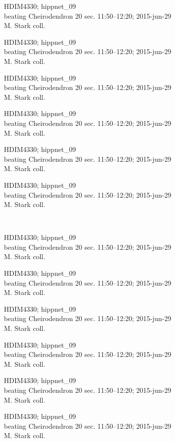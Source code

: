 \documentclass[2pt]{extarticle}
\begin{document}
\noindent
\parbox{0.16\textwidth}{\tiny \raggedright \rule[-0.3\baselineskip]{0pt}{10pt}HDIM4330; hippnet\_09\\ beating Cheirodendron 20 sec. 11:50--12:20; 2015-jun-29\\ M. Stark coll.}
\parbox{0.16\textwidth}{\tiny \raggedright \rule[-0.3\baselineskip]{0pt}{10pt}HDIM4330; hippnet\_09\\ beating Cheirodendron 20 sec. 11:50--12:20; 2015-jun-29\\ M. Stark coll.}
\parbox{0.16\textwidth}{\tiny \raggedright \rule[-0.3\baselineskip]{0pt}{10pt}HDIM4330; hippnet\_09\\ beating Cheirodendron 20 sec. 11:50--12:20; 2015-jun-29\\ M. Stark coll.}
\parbox{0.16\textwidth}{\tiny \raggedright \rule[-0.3\baselineskip]{0pt}{10pt}HDIM4330; hippnet\_09\\ beating Cheirodendron 20 sec. 11:50--12:20; 2015-jun-29\\ M. Stark coll.}
\parbox{0.16\textwidth}{\tiny \raggedright \rule[-0.3\baselineskip]{0pt}{10pt}HDIM4330; hippnet\_09\\ beating Cheirodendron 20 sec. 11:50--12:20; 2015-jun-29\\ M. Stark coll.}
\parbox{0.16\textwidth}{\tiny \raggedright \rule[-0.3\baselineskip]{0pt}{10pt}HDIM4330; hippnet\_09\\ beating Cheirodendron 20 sec. 11:50--12:20; 2015-jun-29\\ M. Stark coll.} \\ 
\vspace{0.001in} 

\noindent
\parbox{0.16\textwidth}{\tiny \raggedright \rule[-0.3\baselineskip]{0pt}{10pt}HDIM4330; hippnet\_09\\ beating Cheirodendron 20 sec. 11:50--12:20; 2015-jun-29\\ M. Stark coll.}
\parbox{0.16\textwidth}{\tiny \raggedright \rule[-0.3\baselineskip]{0pt}{10pt}HDIM4330; hippnet\_09\\ beating Cheirodendron 20 sec. 11:50--12:20; 2015-jun-29\\ M. Stark coll.}
\parbox{0.16\textwidth}{\tiny \raggedright \rule[-0.3\baselineskip]{0pt}{10pt}HDIM4330; hippnet\_09\\ beating Cheirodendron 20 sec. 11:50--12:20; 2015-jun-29\\ M. Stark coll.}
\parbox{0.16\textwidth}{\tiny \raggedright \rule[-0.3\baselineskip]{0pt}{10pt}HDIM4330; hippnet\_09\\ beating Cheirodendron 20 sec. 11:50--12:20; 2015-jun-29\\ M. Stark coll.}
\parbox{0.16\textwidth}{\tiny \raggedright \rule[-0.3\baselineskip]{0pt}{10pt}HDIM4330; hippnet\_09\\ beating Cheirodendron 20 sec. 11:50--12:20; 2015-jun-29\\ M. Stark coll.}
\parbox{0.16\textwidth}{\tiny \raggedright \rule[-0.3\baselineskip]{0pt}{10pt}HDIM4330; hippnet\_09\\ beating Cheirodendron 20 sec. 11:50--12:20; 2015-jun-29\\ M. Stark coll.} \\ 
\vspace{0.001in} 
\end{document}
